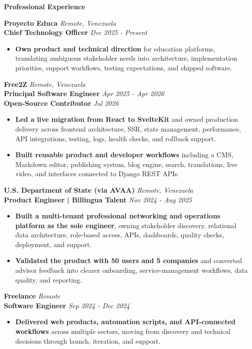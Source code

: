 \documentclass[10pt]{article}
\newcommand{\sectiontitle}[1]{%
    \vspace{3pt}
    \begin{center}
        \textbf{#1}
    \end{center}
    \vspace{-5pt}
}
\begin{document}
\sectiontitle{Professional Experience}
\textbf{Proyecto Educa} \hfill \textit{Remote, Venezuela} \\
\textbf{Chief Technology Officer} \hfill \textit{Dec 2025 - Present}
\begin{itemize}
    \item \textbf{Own product and technical direction} for education platforms, translating ambiguous stakeholder needs into architecture, implementation priorities, support workflows, testing expectations, and shipped software.
\end{itemize}

\vspace{1pt}
\textbf{Free2Z} \hfill \textit{Remote, Venezuela} \\
\textbf{Principal Software Engineer} \hfill \textit{Apr 2025 - Apr 2026} \\
\textbf{Open-Source Contributor} \hfill \textit{Jul 2026}
\begin{itemize}
    \item \textbf{Led a live migration from React to SvelteKit} and owned production delivery across frontend architecture, SSR, state management, performance, API integrations, testing, logs, health checks, and rollback support.
    \item \textbf{Built reusable product and developer workflows} including a CMS, Markdown editor, publishing system, blog engine, search, translations, live video, and interfaces connected to Django REST APIs.
\end{itemize}

\vspace{1pt}
\textbf{U.S. Department of State (via AVAA)} \hfill \textit{Remote, Venezuela} \\
\textbf{Product Engineer | Billingua Talent} \hfill \textit{Nov 2024 - Aug 2025}
\begin{itemize}
    \item \textbf{Built a multi-tenant professional networking and operations platform as the sole engineer}, owning stakeholder discovery, relational data architecture, role-based access, APIs, dashboards, quality checks, deployment, and support.
    \item \textbf{Validated the product with 50 users and 5 companies} and converted advisor feedback into clearer onboarding, service-management workflows, data quality, and reporting.
\end{itemize}

\vspace{1pt}
\textbf{Freelance} \hfill \textit{Remote} \\
\textbf{Software Engineer} \hfill \textit{Sep 2024 - Dec 2024}
\begin{itemize}
    \item \textbf{Delivered web products, automation scripts, and API-connected workflows} across multiple sectors, moving from discovery and technical decisions through launch, iteration, and support.
\end{itemize}
\end{document}
